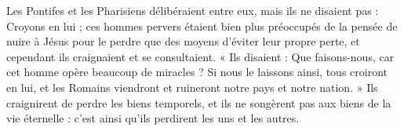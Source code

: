  Les Pontifes et les Pharisiens délibéraient entre eux, mais ils ne disaient pas : Croyons en lui ; ces hommes pervers étaient bien plus préoccupés de la pensée de nuire à Jésus pour le perdre que des moyens d’éviter leur propre perte, et cependant ils craignaient et se consultaient. « Ils disaient : Que faisons-nous, car cet homme opère beaucoup de miracles ? Si nous le laissons ainsi, tous croiront en lui, et les Romains viendront et ruineront notre pays et notre nation. » Ils craignirent de perdre les biens temporels, et ils ne songèrent pas aux biens de la vie éternelle : c’est ainsi qu’ils perdirent les uns et les autres.